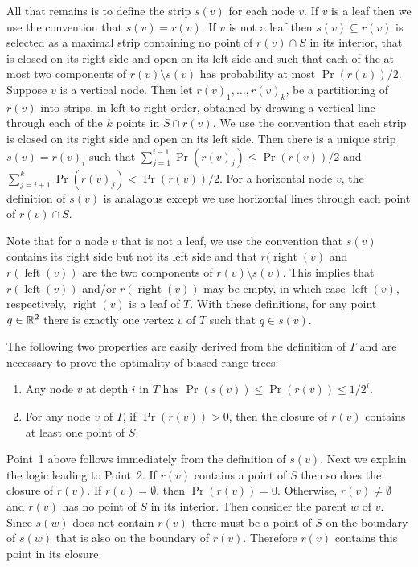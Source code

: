 \documentclass[charterfonts]{patmorin}
\DeclareMathOperator{\lft}{left}
\DeclareMathOperator{\rght}{right}
\begin{document}
All that remains is to define the strip $s(v)$ for each node $v$. If
$v$ is a leaf then we use the convention that $s(v)=r(v)$.  If $v$ is
not a leaf then $s(v)\subseteq r(v)$ is selected as a maximal strip
containing no point of $r(v)\cap S$ in its interior, that is closed on
its right side and open on its left side and such that each of the at
most two components of $r(v)\setminus s(v)$ has probability at most
$\Pr(r(v))/2$.  Suppose $v$ is a vertical node.  Then let
$r(v)_1,\ldots,r(v)_k$, be a partitioning of $r(v)$ into strips, in
left-to-right order, obtained by drawing a vertical line through each
of the $k$ points in $S\cap r(v)$.  We use the convention that each
strip is closed on its right side and open on its left side.  Then
there is a unique strip $s(v)=r(v)_i$ such that $\sum_{j=1}^{i-1}
\Pr(r(v)_j) \le \Pr(r(v))/2$ and $\sum_{j=i+1}^{k} \Pr(r(v)_j) <
\Pr(r(v))/2$.  For a
horizontal node $v$, the definition of $s(v)$ is analagous except we
use horizontal lines through each point of $r(v)\cap S$.

Note that for a node $v$ that is not a leaf, we use the convention
that $s(v)$ contains its right side but not its left side and that
$r(\rght(v)$ and $r(\lft(v))$ are the two components of $r(v)\setminus
s(v)$.  This implies that $r(\lft(v))$ and/or $r(\rght(v))$ may be
empty, in which case $\lft(v)$, respectively, $\rght(v)$ is a leaf of
$T$.  With these definitions, for any point $q\in \mathbb{R}^2$ there is
exactly one vertex $v$ of $T$ such that $q\in s(v)$.

The following two properties are easily derived from the definition of
$T$ and are necessary to prove the optimality of biased range trees:
\begin{enumerate}

\item Any node $v$ at depth $i$ in $T$ has $\Pr(s(v))\le \Pr(r(v))\le 1/2^i$.

\item For any node $v$ of $T$, if $\Pr(r(v)) > 0$, then the closure of
$r(v)$ contains at least one point of $S$.
\end{enumerate}

Point~1 above follows immediately from the definition of $s(v)$. Next
we explain the logic leading to Point~2.  If $r(v)$ contains a point
of $S$ then so does the closure of $r(v)$.   If $r(v)=\emptyset$, then
$\Pr(r(v)) = 0$.  Otherwise, $r(v) \neq \emptyset$ and $r(v)$ has no
point of $S$ in its interior.  Then consider the parent $w$ of $v$.
Since $s(w)$ does not contain $r(v)$ there must be a point of $S$ on
the boundary of $s(w)$ that is also on the boundary of $r(v)$.
Therefore $r(v)$ contains this point in its closure.
\end{document}
